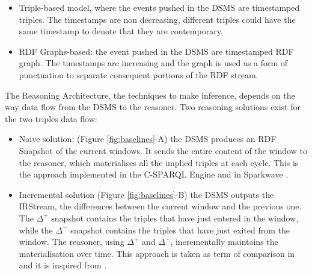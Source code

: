 \begin{itemize}	
\item Triple-based model, where the events pushed in the DSMS are timestamped triples. The timestamps are non decreasing, different triples could have the same timestamp to denote that they are contemporary.
\item RDF Graphs-based: the event pushed in the DSMS are timestamped RDF graph. The timestamps are increasing and the graph is used as a form of punctuation \cite{Tatbul2003b} to separate consequent portions of the RDF stream.
\end{itemize}

The Reasoning Architecture, the techniques to make inference, depends on the way data flow from the DSMS to the reasoner. Two reasoning solutions exist for the two triples data flow:

\begin{itemize}
\item Naive solution: (Figure \ref{fig:baselines}-A) the DSMS produces an RDF Snapshot of the current windows. It sends the entire content of the window to the reasoner, which materialises all the implied triples at each cycle. This is the approach implemented in the C-SPARQL Engine \cite{DBLP:journals/sigmod/BarbieriBCVG10} and in Sparkwave \cite{DBLP:conf/debs/KomazecCF12}.
\item Incremental solution (Figure \ref{fig:baselines}-B) the DSMS outputs the IRStream, the differences between the current window and the previous one. The $\Delta^{+}$ snapshot contains the triples that have just entered in the window, while the $\Delta^{-}$ snapshot contains the triples that have just exited from the window. The reasoner, using $\Delta^{+}$ and $\Delta^{-}$, incrementally maintains the materialisation over time. This approach is taken as term of comparison in \cite{DellAglio2014} and it is inspired from \cite{DBLP:conf/cikm/RenP11}.
\end{itemize}

